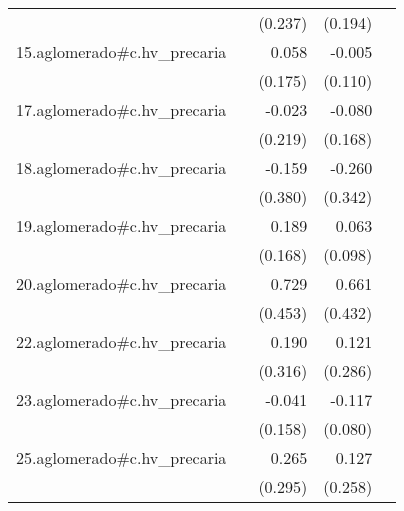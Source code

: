 {\begin{longtable}{l*{4}{D{.}{.}{-1}}}
            &                     &     (0.237)         &     (0.194)         &                     \\
\addlinespace
15.aglomerado#c.hv\_precaria&                     &       0.058         &      -0.005         &                     \\
            &                     &     (0.175)         &     (0.110)         &                     \\
\addlinespace
17.aglomerado#c.hv\_precaria&                     &      -0.023         &      -0.080         &                     \\
            &                     &     (0.219)         &     (0.168)         &                     \\
\addlinespace
18.aglomerado#c.hv\_precaria&                     &      -0.159         &      -0.260         &                     \\
            &                     &     (0.380)         &     (0.342)         &                     \\
\addlinespace
19.aglomerado#c.hv\_precaria&                     &       0.189         &       0.063         &                     \\
            &                     &     (0.168)         &     (0.098)         &                     \\
\addlinespace
20.aglomerado#c.hv\_precaria&                     &       0.729         &       0.661         &                     \\
            &                     &     (0.453)         &     (0.432)         &                     \\
\addlinespace
22.aglomerado#c.hv\_precaria&                     &       0.190         &       0.121         &                     \\
            &                     &     (0.316)         &     (0.286)         &                     \\
\addlinespace
23.aglomerado#c.hv\_precaria&                     &      -0.041         &      -0.117         &                     \\
            &                     &     (0.158)         &     (0.080)         &                     \\
\addlinespace
25.aglomerado#c.hv\_precaria&                     &       0.265         &       0.127         &                     \\
            &                     &     (0.295)         &     (0.258)         &                     \\

\end{longtable}}
